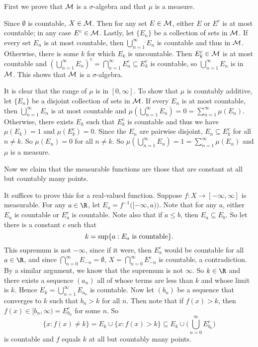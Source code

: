 First we prove that ${\cal M}$ is a $\sigma$-algebra and that $\mu$ is a measure.

\proof Since $\emptyset$ is countable, $X\in {\cal M}$. Then for any set $E\in {\cal M}$, either $E$ or $E^c$ is at most countable; in any case $E^c\in {\cal M}$. Lastly, let $\{E_n\}$ be a collection of sets in ${\cal M}$. If every set $E_n$ is at most countable, then $\bigcup_{n=1}^\infty E_n$ is countable and thus in ${\cal M}$. Otherwise, there is some $k$ for which $E_k$ is uncountable. Then $E_k^c\in {\cal M}$ is at most countable and $\left(\bigcup_{n=1}^\infty E_n\right)^c = \bigcap_{n=1}^\infty E_n^c \subseteq E_k^c$ is countable, so $\bigcup_{n=1}^\infty E_n$ is in ${\cal M}$. This shows that ${\cal M}$ is a $\sigma$-algebra.

It is clear that the range of $\mu$ is in $[0,\infty]$. To show that $\mu$ is countably additive, let $\{E_n\}$ be a disjoint collection of sets in ${\cal M}$. If every $E_n$ is at most countable, then $\bigcup_{n=1}^\infty E_n$ is at most countable and $\mu(\bigcup_{n=1}^\infty E_n) = 0 = \sum_{n=1}^\infty \mu(E_n)$. Otherwise, there exists $E_k$ such that $E_k^c$ is countable and thus we have $\mu(E_k) = 1$ and $\mu(E_k^c) = 0$. Since the $E_n$ are pairwise disjoint, $E_n\subseteq E_k^c$ for all $n\neq k$. So $\mu(E_n) = 0$ for all $n\neq k$. So $\mu(\bigcup_{n=1}^\infty E_n) = 1 = \sum_{n=1}^\infty \mu(E_n)$ and $\mu$ is a measure.\slug

Now we claim that the measurable functions are those that are constant at all but countably many points.

\proof It suffices to prove this for a real-valued function. Suppose $f:X\rightarrow[-\infty,\infty]$ is measurable. For any $a\in \R$, let $E_a = f^{-1}\big([-\infty,a)\big)$. Note that for any $a$, either $E_a$ is countable or $E_a^c$ is countable. Note also that if $a\leq b$, then $E_a \subseteq E_b$. So let there is a constant $c$ such that
$$k = \sup\{a : E_a\ \hbox{is countable}\}.$$
This supremum is not $-\infty$, since if it were, then $E_a^c$ would be countable for all $a\in \R$, and since $\bigcap_{n=0}^\infty E_{-n} = \emptyset$, $X = \bigcap_{n=0}^\infty E_{-n}^c$ is countable, a contradiction. By a similar argument, we know that the supremum is not $\infty$. So $k\in \R$ and there exists a sequence $(a_n)$ all of whose terms are less than $k$ and whose limit is $k$. Hence $E_k = \bigcup_{n=1}^\infty E_{a_n}$ is countable. Now let $(b_n)$ be a sequence that converges to $k$ such that $b_n > k$ for all $n$. Then note that if $f(x) > k$, then $f(x) \in [b_n, \infty) = E_{b_n}^c$ for some $n$. So
$$\{x : f(x) \neq k\} = E_k \cup \{x : f(x) > k\} \subseteq E_k \cup \Big(\bigcup_{n=0}^\infty E_{b_n}^c\Big)$$
is countable and $f$ equals $k$ at all but countably many points.\slug

